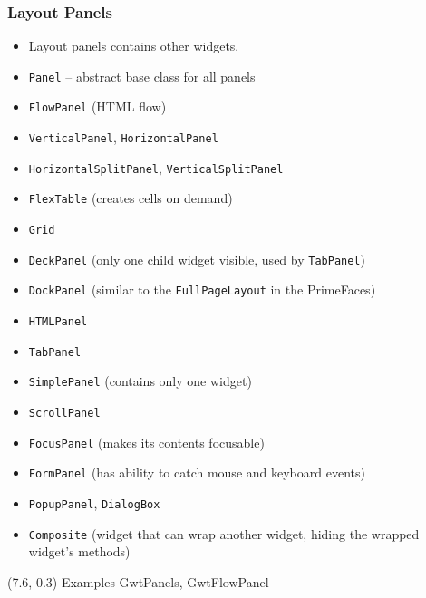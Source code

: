 \documentclass[10pt,table, xcolor=pdflatex]{beamer}
\begin{document}
\begin{frame}\frametitle{Layout Panels}
	\begin{itemize}
		\item Layout panels contains other widgets.
		\item \texttt{Panel} -- abstract base class for all panels
		\item \texttt{FlowPanel} {\footnotesize (HTML flow)}
        \item \texttt{VerticalPanel}, \texttt{HorizontalPanel}
		\item \texttt{HorizontalSplitPanel}, \texttt{VerticalSplitPanel}
		\item \texttt{FlexTable} {\footnotesize (creates cells on demand)}
		\item \texttt{Grid}
		\item \texttt{DeckPanel} {\footnotesize (only one child widget visible, used by \texttt{TabPanel})}
		\item \texttt{DockPanel} {\footnotesize (similar to the \texttt{FullPageLayout} in the PrimeFaces)}
		\item \texttt{HTMLPanel}
		\item \texttt{TabPanel}
        \item \texttt{SimplePanel} {\footnotesize (contains only one widget)}
        \item \texttt{ScrollPanel}
        \item \texttt{FocusPanel}  {\footnotesize (makes its contents focusable)}
        \item \texttt{FormPanel}  {\footnotesize (has ability to catch mouse and keyboard events)}
		\item \texttt{PopupPanel}, \texttt{DialogBox}
		\item \texttt{Composite} {\footnotesize (widget that can wrap another widget, hiding the wrapped widget's methods)}
	\end{itemize}
\begin{textblock}{15}(7.6,-0.3)
    {\footnotesize Examples GwtPanels, GwtFlowPanel}
\end{textblock}
\end{frame}
\end{document}
